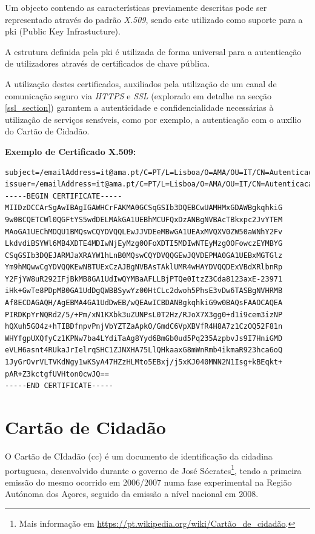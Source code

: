 Um objecto contendo as características previamente descritas pode ser representado através do padrão \emph{X.509}, sendo este utilizado como suporte para a \gls{pki} (Public Key Infrastucture).

A estrutura definida pela \gls{pki} é utilizada de forma universal para a autenticação de utilizadores através de certificados de chave pública.\cite{pki}

A utilização destes certificados, auxiliados pela utilização de um canal de comunicação seguro via \emph{HTTPS} e \emph{SSL} (explorado em detalhe na secção \ref{ssl_section}) garantem a autenticidade e confidencialidade necessárias à utilização de serviços sensíveis, como por exemplo, a autenticação com o auxílio do Cartão de Cidadão.

\vspace{10mm}
\textbf{Exemplo de Certificado X.509:}
\begin{verbatim}
subject=/emailAddress=it@ama.pt/C=PT/L=Lisboa/O=AMA/OU=IT/CN=Autenticacao.Gov
issuer=/emailAddress=it@ama.pt/C=PT/L=Lisboa/O=AMA/OU=IT/CN=Autenticacao.Gov
-----BEGIN CERTIFICATE-----
MIIDzDCCArSgAwIBAgIGAWHCrFAKMA0GCSqGSIb3DQEBCwUAMHMxGDAWBgkqhkiG
9w0BCQETCWl0QGFtYS5wdDELMAkGA1UEBhMCUFQxDzANBgNVBAcTBkxpc2JvYTEM
MAoGA1UEChMDQU1BMQswCQYDVQQLEwJJVDEeMBwGA1UEAxMVQXV0ZW50aWNhY2Fv
LkdvdiBSYWl6MB4XDTE4MDIwNjEyMzg0OFoXDTI5MDIwNTEyMzg0OFowczEYMBYG
CSqGSIb3DQEJARMJaXRAYW1hLnB0MQswCQYDVQQGEwJQVDEPMA0GA1UEBxMGTGlz
Ym9hMQwwCgYDVQQKEwNBTUExCzAJBgNVBAsTAklUMR4wHAYDVQQDExVBdXRlbnRp
Y2FjYW8uR292IFjBkMB8GA1UdIwQYMBaAFLLBjPTQe0ItzZ3Cda8123axE-23971
iHk+GwTe8PDpMB0GA1UdDgQWBBSywYz00HtCLc2dwoh5PhsE3vDw6TASBgNVHRMB
Af8ECDAGAQH/AgEBMA4GA1UdDwEB/wQEAwICBDANBgkqhkiG9w0BAQsFAAOCAQEA
PIRDKpYrNQRd2/5/+Pm/xN1KXbk3uZUNPsL0T2Hz/RJoX7X3gg0+d1i9cem3izNP
hQXuh5GO4z+hTIBDfnpvPnjVbYZTZaApkO/GmdC6VpXBVfR4H8A7z1CzOQ52F81n
WHYfgpUXQfyCz1KPNw7ba4LYdiTaAg8Yyd6BmGb0ud5Pq235AzpbvJs9I7HniGMD
eVLH6asnt4RUkaJrIelrqSHC1ZJNXHA75LlQHkaaxG8mWnRmb4ikmaR923hca6oQ
1JyGrOvrVLTVKdNgy1wKSyA47HZzHLMto5EBxj/j5xKJ040MNN2N1Isg+kBEqkt+
pAR+Z3kctgfUVHton0cwJQ==
-----END CERTIFICATE-----
\end{verbatim}

\newpage
\section{Cartão de Cidadão}

O Cartão de CIdadão (\gls{cc}) é um documento de identificação da cidadina portuguesa, desenvolvido durante o governo de José Sócrates\footnote{Mais informação em \url{https://pt.wikipedia.org/wiki/Cartão_de_cidadão}.}, tendo a primeira emissão do mesmo ocorrido em 2006/2007 numa fase experimental na Região Autónoma dos Açores, seguido da emissão a nível nacional em 2008.

